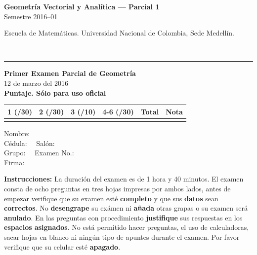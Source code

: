 \documentclass[11pt]{article}
\begin{document}
\noindent
\begin{minipage}[t]{0.6\linewidth}
{\small\bfseries Geometría Vectorial y Analítica --- Parcial 1}\\
{\small Semestre 2016--01}
\end{minipage}%
\hfill
\begin{minipage}[t]{0.35\linewidth}
\raggedleft\small Escuela de Matemáticas. Universidad Nacional de Colombia, Sede Medellín.
\end{minipage}\\[2pt]
\rule{\linewidth}{0.6pt}

\noindent
\begin{minipage}[t]{0.54\linewidth}
\textbf{Primer Examen Parcial de Geometría}\\
12 de marzo del 2016\\[6pt]
\textbf{Puntaje. Sólo para uso oficial}

\small
\begin{tabular}{|c|c|c|c|c|c|}
\hline
1 (/30) & 2 (/30) & 3 (/10) & 4-6 (/30) & Total & Nota \\
\hline
 & & & & & \\
\hline
\end{tabular}
\end{minipage}%
\begin{minipage}[t]{0.44\linewidth}
Nombre: \underline{\hspace{4.8cm}}\\[8pt]
Cédula: \underline{\hspace{1.8cm}}\ \ Salón: \underline{\hspace{1.2cm}}\\[8pt]
Grupo: \underline{\hspace{1.8cm}}\ \ Examen No.: \underline{\hspace{1.6cm}}\\[8pt]
Firma: \underline{\hspace{4.8cm}}
\end{minipage}

\vspace{10pt}
\textbf{Instrucciones:} La duración del examen es de 1 hora y 40 minutos. El examen consta de ocho preguntas en tres hojas impresas por ambos lados, antes de empezar verifique que su examen esté \textbf{completo} y que sus \textbf{datos} sean \textbf{correctos}. No \textbf{desengrape} su exámen ni \textbf{añada} otras grapas o su examen será \textbf{anulado}. En las preguntas con procedimiento \textbf{justifique} sus respuestas en los \textbf{espacios asignados}. No está permitido hacer preguntas, el uso de calculadoras, sacar hojas en blanco ni ningún tipo de apuntes durante el examen. Por favor verifique que su celular esté \textbf{apagado}.
\end{document}
